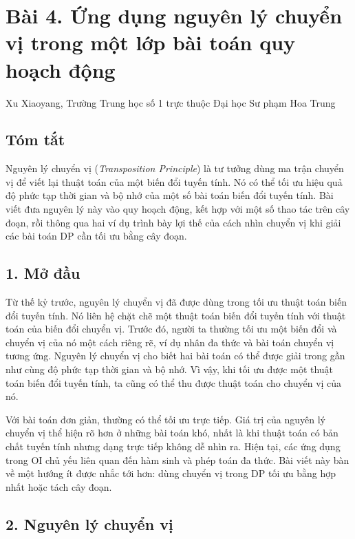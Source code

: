 \documentclass[11pt]{article}
\begin{document}
\section*{Bài 4. Ứng dụng nguyên lý chuyển vị trong một lớp bài toán quy hoạch động}

\begin{center}
Xu Xiaoyang, Trường Trung học số 1 trực thuộc Đại học Sư phạm Hoa Trung
\end{center}

\subsection*{Tóm tắt}

Nguyên lý chuyển vị (\emph{Transposition Principle}) là tư tưởng dùng ma trận
chuyển vị để viết lại thuật toán của một biến đổi tuyến tính. Nó có thể tối ưu
hiệu quả độ phức tạp thời gian và bộ nhớ của một số bài toán biến đổi tuyến
tính. Bài viết đưa nguyên lý này vào quy hoạch động, kết hợp với một số thao
tác trên cây đoạn, rồi thông qua hai ví dụ trình bày lợi thế của cách nhìn
chuyển vị khi giải các bài toán DP cần tối ưu bằng cây đoạn.

\subsection*{1. Mở đầu}

Từ thế kỷ trước, nguyên lý chuyển vị đã được dùng trong tối ưu thuật toán biến
đổi tuyến tính. Nó liên hệ chặt chẽ một thuật toán biến đổi tuyến tính với
thuật toán của biến đổi chuyển vị. Trước đó, người ta thường tối ưu một biến
đổi và chuyển vị của nó một cách riêng rẽ, ví dụ nhân đa thức và bài toán
chuyển vị tương ứng. Nguyên lý chuyển vị cho biết hai bài toán có thể được giải
trong gần như cùng độ phức tạp thời gian và bộ nhớ. Vì vậy, khi tối ưu được
một thuật toán biến đổi tuyến tính, ta cũng có thể thu được thuật toán cho
chuyển vị của nó.

Với bài toán đơn giản, thường có thể tối ưu trực tiếp. Giá trị của nguyên lý
chuyển vị thể hiện rõ hơn ở những bài toán khó, nhất là khi thuật toán có bản
chất tuyến tính nhưng dạng trực tiếp không dễ nhìn ra. Hiện tại, các ứng dụng
trong OI chủ yếu liên quan đến hàm sinh và phép toán đa thức. Bài viết này bàn
về một hướng ít được nhắc tới hơn: dùng chuyển vị trong DP tối ưu bằng hợp nhất
hoặc tách cây đoạn.

\subsection*{2. Nguyên lý chuyển vị}
\end{document}
